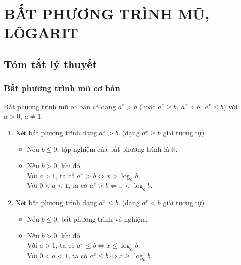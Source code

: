 \section{BẤT PHƯƠNG TRÌNH MŨ, LÔGARIT}
\subsection{Tóm tắt lý thuyết}
\subsubsection{Bất phương trình mũ cơ bản}

\begin{dn}
	Bất phương trình mũ cơ bản có dạng $a^x>b$ 
	(hoặc $a^x\ge b,\ a^x<b,\ a^x\le b$) với $a>0,\ a\ne 1$.
\end{dn}

\begin{enumerate}
	\item Xét bất phương trình dạng $a^x>b$. (dạng $a^x\ge b$ giải tương tự)
	\begin{itemize}
		\item Nếu $b\le 0$, tập nghiệm của bất phương trình là $\mathbb{R}$.
		\item Nếu $b>0$, khi đó\\
		Với $a>1$, ta có $a^x>b \Leftrightarrow x>\log_a b$.\\
		Với $0<a<1$, ta có $a^x>b \Leftrightarrow x<\log_a b$.
	\end{itemize}
	\item Xét bất phương trình dạng $a^x\le b$. (dạng $a^x< b$ giải tương tự)
	\begin{itemize}
		\item Nếu $b\le 0$, bất phương trình vô nghiệm.
		\item Nếu $b>0$, khi đó\\
		Với $a>1$, ta có $a^x\le b \Leftrightarrow x \le \log_a b$.\\
		Với $0<a<1$, ta có $a^x \le b \Leftrightarrow x \ge \log_a b$.
	\end{itemize}
\end{enumerate}
